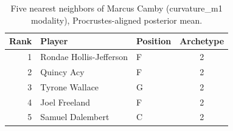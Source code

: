 \begin{table}[htbp]
  \centering\small
  \begin{tabular}{rllc}
    \toprule
    Rank & Player & Position & Archetype \\
    \midrule
    1 & Rondae Hollis-Jefferson & F & 2 \\
    2 & Quincy Acy & F & 2 \\
    3 & Tyrone Wallace & G & 2 \\
    4 & Joel Freeland & F & 2 \\
    5 & Samuel Dalembert & C & 2 \\
    \bottomrule
  \end{tabular}
  \caption{Five nearest neighbors of Marcus Camby (curvature_m1 modality), Procrustes-aligned posterior mean.}
  \label{tab:Marcus_Camby_neighbors_curvature_m1}
\end{table}

